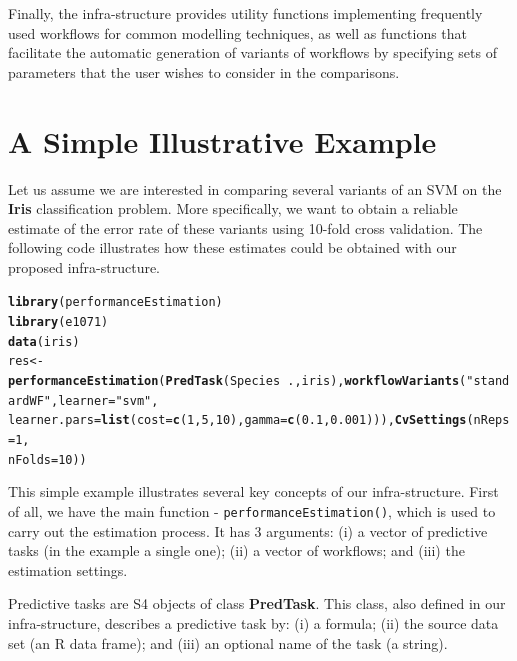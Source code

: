 \documentclass[10pt,a4paper]{article}\usepackage[]{graphicx}\usepackage[]{color}
\makeatletter
\newcommand{\hlnum}[1]{\textcolor[rgb]{0.686,0.059,0.569}{#1}}%
\newcommand{\hlstr}[1]{\textcolor[rgb]{0.192,0.494,0.8}{#1}}%
\newcommand{\hlopt}[1]{\textcolor[rgb]{0,0,0}{#1}}%
\newcommand{\hlstd}[1]{\textcolor[rgb]{0.345,0.345,0.345}{#1}}%
\newcommand{\hlkwb}[1]{\textcolor[rgb]{0.69,0.353,0.396}{#1}}%
\newcommand{\hlkwc}[1]{\textcolor[rgb]{0.333,0.667,0.333}{#1}}%
\newcommand{\hlkwd}[1]{\textcolor[rgb]{0.737,0.353,0.396}{\textbf{#1}}}%
\newenvironment{kframe}{%
 \def\at@end@of@kframe{}%
 \ifinner\ifhmode%
  \def\at@end@of@kframe{\end{minipage}}%
  \begin{minipage}{\columnwidth}%
 \fi\fi%
 \def\FrameCommand##1{\hskip\@totalleftmargin \hskip-\fboxsep
 \colorbox{shadecolor}{##1}\hskip-\fboxsep
     \hskip-\linewidth \hskip-\@totalleftmargin \hskip\columnwidth}%
 \MakeFramed {\advance\hsize-\width
   \@totalleftmargin\z@ \linewidth\hsize
   \@setminipage}}%
 {\par\unskip\endMakeFramed%
 \at@end@of@kframe}
\newenvironment{knitrout}{}{} %
\makeatother
\begin{document}
Finally, the infra-structure provides utility functions
implementing frequently used workflows for common modelling techniques, as
well as functions that facilitate the automatic generation of variants
of workflows by specifying sets of parameters that the user wishes to
consider in the comparisons.

\section{A Simple Illustrative Example}\label{sec:simpleEx}

Let us assume we are interested in comparing several variants of
an SVM on the
\textbf{Iris} classification problem. More specifically, we want to
obtain a reliable estimate of the error rate of these variants using
10-fold cross validation. The following code illustrates how these
estimates could be obtained with our proposed infra-structure.

\begin{knitrout}
\color{fgcolor}\begin{kframe}
\begin{alltt}
\hlkwd{library}\hlstd{(performanceEstimation)}
\hlkwd{library}\hlstd{(e1071)}
\hlkwd{data}\hlstd{(iris)}
\hlstd{res} \hlkwb{<-} \hlkwd{performanceEstimation}\hlstd{(}\hlkwd{PredTask}\hlstd{(Species} \hlopt{~} \hlstd{., iris),} \hlkwd{workflowVariants}\hlstd{(}\hlstr{"standardWF"}\hlstd{,} \hlkwc{learner} \hlstd{=} \hlstr{"svm"}\hlstd{,}
    \hlkwc{learner.pars} \hlstd{=} \hlkwd{list}\hlstd{(}\hlkwc{cost} \hlstd{=} \hlkwd{c}\hlstd{(}\hlnum{1}\hlstd{,} \hlnum{5}\hlstd{,} \hlnum{10}\hlstd{),} \hlkwc{gamma} \hlstd{=} \hlkwd{c}\hlstd{(}\hlnum{0.1}\hlstd{,} \hlnum{0.001}\hlstd{))),} \hlkwd{CvSettings}\hlstd{(}\hlkwc{nReps} \hlstd{=} \hlnum{1}\hlstd{,}
    \hlkwc{nFolds} \hlstd{=} \hlnum{10}\hlstd{))}
\end{alltt}
\end{kframe}
\end{knitrout}


This simple example illustrates several key concepts of our
infra-structure. First of all, we have the main function  -
\texttt{performanceEstimation()}, which is used to carry out
the estimation process. It has 3 arguments: (i) a vector of
predictive tasks (in the example a single one); (ii) a vector of workflows; and (iii) the
estimation settings. 

Predictive tasks are S4 objects of class
\textbf{PredTask}. This class, also defined in our infra-structure,
describes a predictive task by: (i) a formula; (ii) the source data
set (an R data frame); and (iii) an optional name of the task (a
string). 
\end{document}
